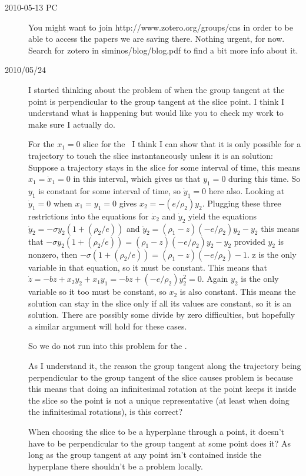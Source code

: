 \begin{description}
\item[2010-05-13 PC] You might want to join
{http://www.zotero.org/groups/cns}
in order to be able to access the papers we are saving there. Nothing
urgent, for now. Search for zotero in siminos/blog/blog.pdf to find
a bit more info about it.

\item[2010/05/24] I started thinking about the problem of when the group tangent at the point is perpendicular to the group tangent at the slice point. I think I understand what is happening but would like you to check my work to make sure I actually do.

    For the $x_1 = 0$ slice for the \cLe\ I think I can show that it is only possible for a trajectory to touch the slice instantaneously unless it is an {\eqv} solution: Suppose a trajectory stays in the slice for some interval of time, this means $x_1 = \dot x_1 = 0$ in this interval, which gives us that $y_1 = 0$ during this time. So $y_1$ is constant for some interval of time, so $\dot y_1=0$ here also. Looking at $\dot y_1 = 0$ when $x_1=y_1 =0$ gives $x_2 = -(e/\rho_2)y_2$. Plugging these three restrictions into the equations for $\dot x_2$ and $\dot y_2$ yield the equations $\dot y_2=-\sigma y_2 (1+(\rho_2 / e))$ and $\dot y_2 = (\rho_1 - z)(-e/\rho_2)y_2-y_2$ this means that $-\sigma y_2 (1+(\rho_2 / e))=(\rho_1 - z)(-e/\rho_2)y_2-y_2$ provided $y_2$ is nonzero, then $-\sigma (1+(\rho_2 / e))=(\rho_1-z)(-e/\rho_2)-1$. z is the only variable in that equation, so it must be constant. This means that $\dot z = -b z + x_2 y_2 + x_1 y_1=-b z+ (-e/\rho_2)y_2^2=0$. Again $y_2$ is the only variable so it too must be constant, so $x_2$ is also constant. This means the solution can stay in the slice only if all its values are constant, so it is an {\eqv} solution. There are possibly some divide by zero difficulties, but hopefully a similar argument will hold for these cases.

    So we do not run into this problem for the \cLf.

    As I understand it, the reason the group tangent along the trajectory being perpendicular to the group tangent of the slice causes problem is because this means that doing an infinitesimal rotation at the point keeps it inside the slice so the point is not a unique representative (at least when doing the infinitesimal rotations), is this correct?

    When choosing the slice to be a hyperplane through a point, it doesn't have to be perpendicular to the group tangent at some point does it? As long as the group tangent at any point isn't contained inside the hyperplane there shouldn't be a problem locally.


\end{description}
